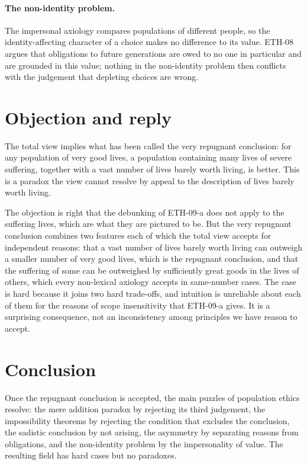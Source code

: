 \documentclass{situationist-preprint}
\begin{document}
\paragraph{The non-identity problem.} The impersonal axiology compares populations of different people, so the identity-affecting character of a choice makes no difference to its value. ETH-08 argues that obligations to future generations are owed to no one in particular and are grounded in this value; nothing in the non-identity problem then conflicts with the judgement that depleting choices are wrong.

\section{Objection and reply}

\begin{objection}
The total view implies what has been called the very repugnant conclusion: for any population of very good lives, a population containing many lives of severe suffering, together with a vast number of lives barely worth living, is better. This is a paradox the view cannot resolve by appeal to the description of lives barely worth living.
\end{objection}

\begin{reply}
The objection is right that the debunking of ETH-09-a does not apply to the suffering lives, which are what they are pictured to be. But the very repugnant conclusion combines two features each of which the total view accepts for independent reasons: that a vast number of lives barely worth living can outweigh a smaller number of very good lives, which is the repugnant conclusion, and that the suffering of some can be outweighed by sufficiently great goods in the lives of others, which every non-lexical axiology accepts in same-number cases. The case is hard because it joins two hard trade-offs, and intuition is unreliable about each of them for the reasons of scope insensitivity that ETH-09-a gives. It is a surprising consequence, not an inconsistency among principles we have reason to accept.
\end{reply}

\section{Conclusion}

Once the repugnant conclusion is accepted, the main puzzles of population ethics resolve: the mere addition paradox by rejecting its third judgement, the impossibility theorems by rejecting the condition that excludes the conclusion, the sadistic conclusion by not arising, the asymmetry by separating reasons from obligations, and the non-identity problem by the impersonality of value. The resulting field has hard cases but no paradoxes.
\end{document}
